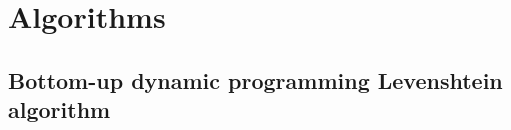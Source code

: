 \section{Algorithms}

\subsection{Bottom-up dynamic programming Levenshtein algorithm}
\label{app:levenshtein_algorithm}
